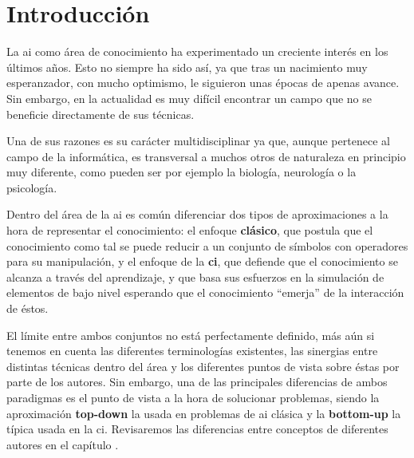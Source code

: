 \chapter{Introducción}
\label{ch:intro}

La \gls{ai} como área de conocimiento ha experimentado un creciente interés en los últimos años. Esto no siempre ha sido así, ya que tras un nacimiento muy esperanzador, con mucho optimismo, le siguieron unas épocas de apenas avance. Sin embargo, en la actualidad es muy difícil encontrar un campo que no se beneficie directamente de sus técnicas.

Una de sus razones es su carácter multidisciplinar ya que, aunque pertenece al campo de la informática, es transversal a muchos otros de naturaleza en principio muy diferente, como pueden ser por ejemplo la biología, neurología o la psicología.

Dentro del área de la \gls{ai} es común diferenciar dos tipos de aproximaciones a la hora de representar el conocimiento: el enfoque \textbf{clásico}, que postula que el conocimiento como tal se puede reducir a un conjunto de símbolos con operadores para su manipulación, y el enfoque de la \textbf{\gls{ci}}, que defiende que el conocimiento se alcanza a través del aprendizaje, y que basa sus esfuerzos en la simulación de elementos de bajo nivel esperando que el conocimiento \enquote{emerja} de la interacción de éstos.

El límite entre ambos conjuntos no está perfectamente definido, más aún si tenemos en cuenta las diferentes terminologías existentes, las sinergias entre distintas técnicas dentro del área y los diferentes puntos de vista sobre éstas por parte de los autores. Sin embargo, una de las principales diferencias de ambos paradigmas es el punto de vista a la hora de solucionar problemas, siendo la aproximación \textbf{top-down} la usada en problemas de \acrshort{ai} clásica y la \textbf{bottom-up} la típica usada en la \acrshort{ci}. Revisaremos las diferencias entre conceptos de diferentes autores en el capítulo .

